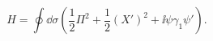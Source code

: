 \begin{equation}\label{toyh}
  H=\oint
  \dd\sigma\left(\frac{1}{2}\Pi^2+\frac{1}{2}(X')^2
  +\ii\psi\gamma_1\psi'\right).
\end{equation}

